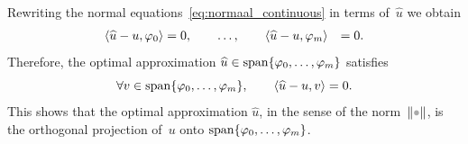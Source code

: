\begin{remark}
    Rewriting the normal equations~\eqref{eq:normaal_continuous} in terms of~$\widehat u$
    we obtain
    \begin{align*}
        \langle\widehat u - u,\varphi_0\rangle &= 0,
        \qquad
        \dots, \qquad
        \langle\widehat u - u,\varphi_m\rangle &= 0.
    \end{align*}
    Therefore, the optimal approximation $\widehat u \in \operatorname{span} \{ \varphi_0, \dotsc, \varphi_m \}$ satisfies
    \[
        \forall v \in \operatorname{span} \{ \varphi_0, \dotsc, \varphi_m \}, \qquad \langle\widehat u - u, v\rangle = 0.
    \]
    This shows that the optimal approximation $\widehat u$,
    in the sense of the norm~$\norm{\placeholder}$,
    is the orthogonal projection of~$u$ onto $\operatorname{span} \{ \varphi_0, \dotsc, \varphi_m \}$.
\end{remark}
